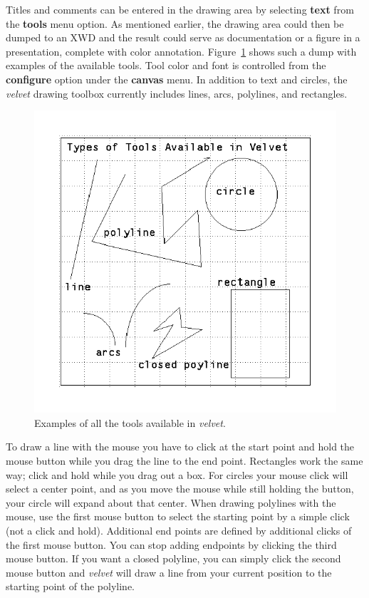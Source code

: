 Titles and comments can be entered in the drawing area by selecting
{\bf text} from the {\bf tools} menu
option.  As mentioned earlier, the drawing 
area could then be dumped to an XWD and the result could serve as 
documentation or a figure in a presentation, complete with color annotation.  
Figure~\ref{velvet.tools_pic} shows such a dump with examples of the available
tools.
Tool color and font is controlled from the {\bf configure} option under the 
{\bf canvas} menu.  In addition to text and circles, the {\em velvet} drawing
toolbox currently includes lines, arcs, polylines, and rectangles.

\begin{figure}
\begin{center}
 \includegraphics[width=5.5in]{figures/velvet_tools}
\end{center}
\caption{Examples of all the tools available in {\em velvet}.}
\label{velvet.tools_pic}
\end{figure}

To draw a line with the mouse you have to click at the start point and hold
the mouse button while you drag the line to the end point.  Rectangles work
the same way; click and hold while you drag out a box.  For circles your
mouse click will select a center point, and as you move the mouse while
still holding the button, your circle will expand about that center.
When drawing polylines with the mouse, use the first mouse button to
select the starting point by a simple click (not a click and hold).  Additional
end points are defined by additional clicks of the first mouse button.
You can stop adding endpoints by clicking the third mouse button.  If you
want a closed polyline, you can simply click the second mouse button and 
{\em velvet} will draw a line from your current position to the starting
point of the polyline.

